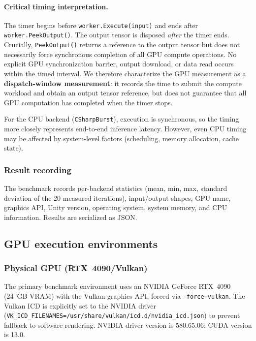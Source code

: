 \documentclass[10pt,twocolumn,letterpaper]{article}
\begin{document}
\paragraph{Critical timing interpretation.}
The timer begins before \texttt{worker.Execute(input)} and ends after \texttt{worker.PeekOutput()}. The output tensor is disposed \emph{after} the timer ends. Crucially, \texttt{PeekOutput()} returns a reference to the output tensor but does not necessarily force synchronous completion of all GPU compute operations. No explicit GPU synchronization barrier, output download, or data read occurs within the timed interval. We therefore characterize the GPU measurement as a \textbf{dispatch-window measurement}: it records the time to submit the compute workload and obtain an output tensor reference, but does not guarantee that all GPU computation has completed when the timer stops.

For the CPU backend (\texttt{CSharpBurst}), execution is synchronous, so the timing more closely represents end-to-end inference latency. However, even CPU timing may be affected by system-level factors (scheduling, memory allocation, cache state).

\subsubsection{Result recording}

The benchmark records per-backend statistics (mean, min, max, standard deviation of the 20 measured iterations), input/output shapes, GPU name, graphics API, Unity version, operating system, system memory, and CPU information. Results are serialized as JSON.

\subsection{GPU execution environments}

\subsubsection{Physical GPU (RTX~4090/Vulkan)}

The primary benchmark environment uses an NVIDIA GeForce RTX~4090 (24~GB VRAM) with the Vulkan graphics API, forced via \texttt{-force-vulkan}. The Vulkan ICD is explicitly set to the NVIDIA driver (\texttt{VK\_ICD\_FILENAMES=/usr/share/vulkan/icd.d/nvidia\_icd.json}) to prevent fallback to software rendering. NVIDIA driver version is 580.65.06; CUDA version is 13.0.
\end{document}
